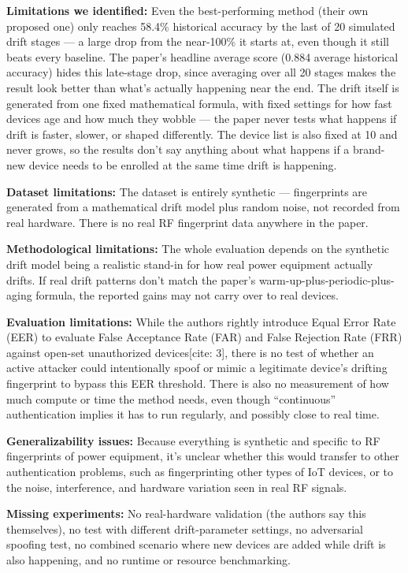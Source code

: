 \documentclass[10pt]{article}
\newcommand{\sumitem}[2]{\noindent\textbf{#1:} #2\par}
\begin{document}
\sumitem{Limitations we identified}{Even the best-performing method (their own proposed one) only reaches 58.4\% historical accuracy by the last of 20 simulated drift stages --- a large drop from the near-100\% it starts at, even though it still beats every baseline. The paper's headline average score (0.884 average historical accuracy) hides this late-stage drop, since averaging over all 20 stages makes the result look better than what's actually happening near the end. The drift itself is generated from one fixed mathematical formula, with fixed settings for how fast devices age and how much they wobble --- the paper never tests what happens if drift is faster, slower, or shaped differently. The device list is also fixed at 10 and never grows, so the results don't say anything about what happens if a brand-new device needs to be enrolled at the same time drift is happening.}

\sumitem{Dataset limitations}{The dataset is entirely synthetic --- fingerprints are generated from a mathematical drift model plus random noise, not recorded from real hardware. There is no real RF fingerprint data anywhere in the paper.}

\sumitem{Methodological limitations}{The whole evaluation depends on the synthetic drift model being a realistic stand-in for how real power equipment actually drifts. If real drift patterns don't match the paper's warm-up-plus-periodic-plus-aging formula, the reported gains may not carry over to real devices.}

\sumitem{Evaluation limitations}{While the authors rightly introduce Equal Error Rate (EER) to evaluate False Acceptance Rate (FAR) and False Rejection Rate (FRR) against open-set unauthorized devices[cite: 3], there is no test of whether an active attacker could intentionally spoof or mimic a legitimate device's drifting fingerprint to bypass this EER threshold. There is also no measurement of how much compute or time the method needs, even though \enquote{continuous} authentication implies it has to run regularly, and possibly close to real time.}

\sumitem{Generalizability issues}{Because everything is synthetic and specific to RF fingerprints of power equipment, it's unclear whether this would transfer to other authentication problems, such as fingerprinting other types of IoT devices, or to the noise, interference, and hardware variation seen in real RF signals.}

\sumitem{Missing experiments}{No real-hardware validation (the authors say this themselves), no test with different drift-parameter settings, no adversarial spoofing test, no combined scenario where new devices are added while drift is also happening, and no runtime or resource benchmarking.}
\end{document}
